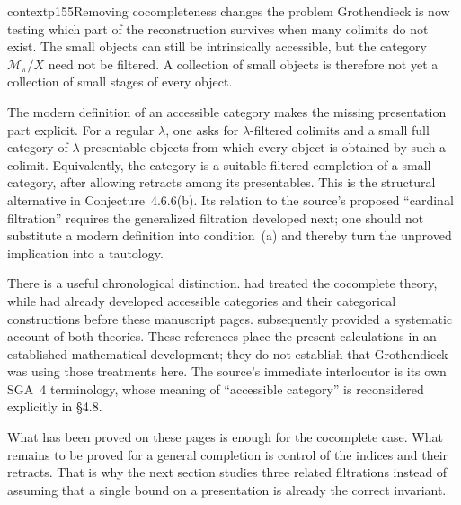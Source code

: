 \begin{dcomment}{context}{p155}{Removing cocompleteness changes the problem}
Grothendieck is now testing which part of the reconstruction survives when many colimits do not exist. The small objects can still be intrinsically accessible, but the category $\mathcal M_\pi/X$ need not be filtered. A collection of small objects is therefore not yet a collection of small stages of every object.

The modern definition of an accessible category makes the missing presentation part explicit. For a regular $\lambda$, one asks for $\lambda$-filtered colimits and a small full category of $\lambda$-presentable objects from which every object is obtained by such a colimit. Equivalently, the category is a suitable filtered completion of a small category, after allowing retracts among its presentables. This is the structural alternative in Conjecture~4.6.6(b). Its relation to the source's proposed ``cardinal filtration'' requires the generalized filtration developed next; one should not substitute a modern definition into condition~(a) and thereby turn the unproved implication into a tautology.

There is a useful chronological distinction. \citet{GabrielUlmer1971} had treated the cocomplete theory, while \citet{MakkaiPare1989} had already developed accessible categories and their categorical constructions before these manuscript pages. \citet{AdamekRosicky1994} subsequently provided a systematic account of both theories. These references place the present calculations in an established mathematical development; they do not establish that Grothendieck was using those treatments here. The source's immediate interlocutor is its own SGA~4 terminology, whose meaning of ``accessible category'' is reconsidered explicitly in \S4.8.

What has been proved on these pages is enough for the cocomplete case. What remains to be proved for a general completion is control of the indices and their retracts. That is why the next section studies three related filtrations instead of assuming that a single bound on a presentation is already the correct invariant.
\end{dcomment}


